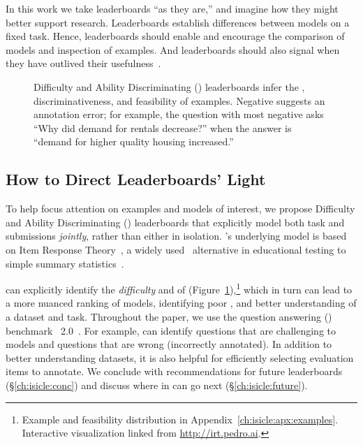 In this work we take leaderboards ``as they are,'' and imagine how they
might better support research.
Leaderboards establish differences between
models on a fixed task.
Hence, leaderboards should enable and encourage the comparison of models and
inspection of examples.
And leaderboards should also signal when they have outlived their usefulness~\citep{boydgraber2020nerds}.

\begin{figure}[t]
  \centering
  \caption{
    Difficulty and Ability Discriminating (\name{}) leaderboards infer the \diff{}, discriminativeness, and feasibility of examples.
    Negative \discability{} suggests an annotation error; for example, the question with most negative \discability{}
    asks ``Why did demand for rentals decrease?'' when the answer is ``demand for higher quality housing increased.''
  }
  \label{fig:irt-dist}
\end{figure}

\subsection{How to Direct Leaderboards' Light}

To help focus attention on examples and models of interest, we propose
Difficulty and Ability Discriminating (\name{}) leaderboards that
explicitly model both task and submissions \emph{jointly}, rather than
either in isolation.
\name{}'s underlying model is based on Item Response Theory~\citep[,
reviewed in \S\ref{ch:isicle:lead}]{lord1968test,baker2001irt}, a widely
used~\citep{van2016assess} alternative in educational testing to simple
summary statistics~\citep{edgeworth1888exams}.

\name{} can explicitly identify the \emph{difficulty} and
  \emph{\discability{}} of \itms{} (Figure~\ref{fig:irt-dist}),\footnote{
  Example and feasibility distribution in
  Appendix~\ref{ch:isicle:apx:examples}.  Interactive visualization linked
  from \href{https://irt.pedro.ai}{http://irt.pedro.ai}.  } which in turn can
  lead to a more nuanced ranking of models, identifying poor \itms{}, and
  better understanding of a dataset and task.  Throughout the paper, we use
  the question answering (\qa{}) benchmark
  \squad{}~2.0~\citep{rajpurkar2018know}.  For example, \name{} can identify
  questions that are challenging to models and questions that are wrong
  (incorrectly annotated).  In addition to better understanding datasets, it
  is also helpful for efficiently selecting evaluation items to annotate.  We
  conclude with recommendations for future leaderboards
  (\S\ref{ch:isicle:conc}) and discuss where \irt{} in \nlp{} can go next
  (\S\ref{ch:isicle:future}).

